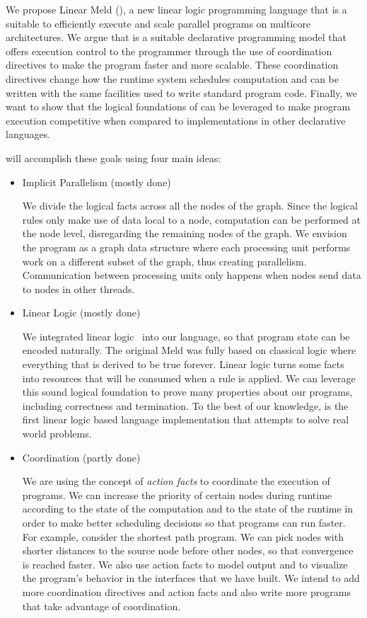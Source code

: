 
We propose Linear Meld (\lang), a new linear logic programming language that is a suitable
to efficiently execute and scale parallel programs on multicore architectures.
We argue that \lang is a suitable declarative programming model that offers execution
control to the programmer through the use of coordination directives to make the program
faster and more scalable. These coordination
directives change how the runtime system schedules computation and can be written with the same
facilities used to write standard program code. Finally, we want to show that the logical foundations
of \lang can be leveraged to make program execution competitive when compared to implementations
in other declarative languages.

\lang will accomplish these goals using four main ideas:


\begin{itemize}
   \item Implicit Parallelism (mostly done)
   
   We divide the logical facts across all the nodes of the graph. Since the
   logical rules only make use of data local to a node, computation can be performed at the
   node level, disregarding the remaining nodes of the graph. We envision the program as
   a graph data structure where each processing unit performs work on a different subset of the graph,
   thus creating parallelism. Communication between processing units only happens when nodes send data
   to nodes in other threads.
   
   \item Linear Logic (mostly done)

   We integrated linear logic~\cite{Girard95logic:its} into our language, so that program state
   can be encoded naturally. The original Meld was fully based on classical logic where everything that
   is derived to be true forever. Linear logic turns some facts into resources that will be consumed when a rule is applied. We can leverage this sound logical foundation to prove many properties about our programs, including correctness and termination. To the best of our knowledge, \lang is the first
   linear logic based language implementation that attempts to solve real world problems.

   \item Coordination (partly done)
   
   We are using the concept of \emph{action facts} to coordinate the execution of programs.
   We can increase the priority of certain nodes during runtime according to the state of the
   computation and to the state of the runtime in order to make better scheduling decisions
   so that programs can run faster.
   For example, consider the shortest path program. We can pick nodes with shorter
   distances to the source node before other nodes, so that convergence is reached faster.
   We also use action facts to model output and to visualize the program's behavior in the
   interfaces that we have built. We intend to add more coordination directives and action facts
   and also write more programs that take advantage of coordination.


\end{itemize}
